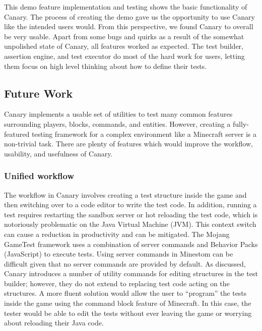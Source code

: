 \documentclass[12pt]{article}
\begin{document}
\begin{onehalfspacing}


This demo feature implementation and testing shows the basic
functionality of Canary. The process of creating the demo gave us the
opportunity to use Canary like the intended users would. From this
perspective, we found Canary to overall be very usable. Apart from some
bugs and quirks as a result of the somewhat unpolished state of Canary,
all features worked as expected. The test builder, assertion engine, and
test executor do most of the hard work for users, letting them focus on
high level thinking about how to define their tests.

\subsection{Future Work}

Canary implements a usable set of utilities to test many common features
surrounding players, blocks, commands, and entities. However, creating a
fully-featured testing framework for a complex environment like a
Minecraft server is a non-trivial task. There are plenty of features
which would improve the workflow, usability, and usefulness of Canary.

\subsubsection{Unified workflow}

The workflow in Canary involves creating a test structure inside the
game and then switching over to a code editor to write the test code. In
addition, running a test requires restarting the sandbox server or hot
reloading the test code, which is notoriously problematic on the Java
Virtual Machine (JVM). This context switch can cause a reduction in
productivity and can be mitigated. The Mojang GameTest framework uses a
combination of server commands and Behavior Packs (JavaScript) to
execute tests. Using server commands in Minestom can be difficult given
that no server commands are provided by default. As discussed, Canary
introduces a number of utility commands for editing structures in the
test builder; however, they do not extend to replacing test code acting
on the structures. A more fluent solution would allow the user to
``program'' the tests inside the game using the command block feature of
Minecraft. In this case, the tester would be able to edit the tests
without ever leaving the game or worrying about reloading their Java
code.


\end{onehalfspacing}
\end{document}
